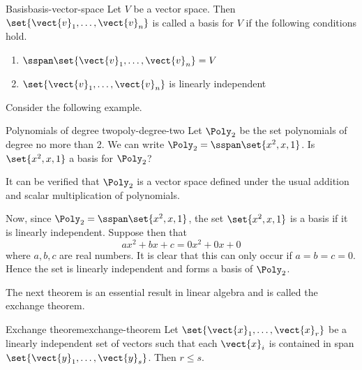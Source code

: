 \begin{definition}{Basis}{basis-vector-space}
Let $V$ be a vector space. Then $\set{\vect{v}_{1},\ldots,\vect{v}_{n}}$ is called a basis for $V$ if the following conditions hold.
\begin{enumerate}
\item
$\sspan\set{\vect{v}_{1},\ldots,\vect{v}_{n}} = V$
\item
$\set{\vect{v}_{1},\ldots,\vect{v}_{n}}$ is linearly independent
\end{enumerate}
\end{definition}

Consider the following example.

\begin{example}{Polynomials of degree two}{poly-degree-two}
Let $\Poly_2$ be the set polynomials of degree no more than 2. We can write
$\Poly_2=\sspan\set{x^{2}, x, 1}$. Is $\set{x^{2}, x, 1} $ a
basis for $\Poly_2$?
\end{example}

\begin{solution}
It can be verified that $\Poly_2$ is a vector space defined under the usual addition and scalar multiplication of polynomials.

Now, since $\Poly_2=\sspan\set{x^{2},x, 1}$, the set  $\set{x^{2}, x, 1} $ is a basis if it is linearly independent. Suppose then that
\begin{equation*}
ax^{2}+bx+c=0x^2 + 0x + 0
\end{equation*}
where $a,b,c$ are real numbers. It is clear that this can only occur if $a=b=c=0$. Hence the set is linearly independent and forms a basis of $\Poly_2$.
\end{solution}

The next theorem is an essential result in linear algebra and is called the exchange theorem.

\begin{theorem}{Exchange theorem}{exchange-theorem}
Let $\set{\vect{x}_{1},\ldots,\vect{x}_{r}} $
be a linearly independent set of vectors such that each $\vect{x}_{i}$ is
contained in span$\set{\vect{y}_{1},\ldots,\vect{y}_{s}}$. Then $
r\leq s$.
\end{theorem}

